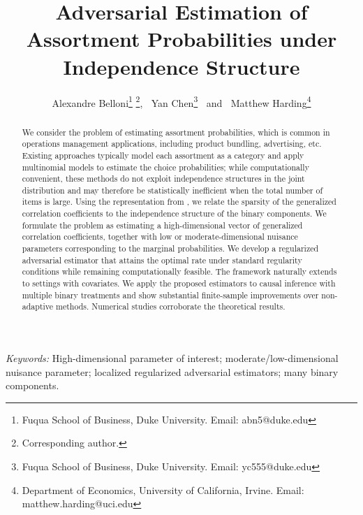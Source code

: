 \documentclass[11pt]{article}
\begin{document}
\title{{\textbf{\Large{}{}{}{}Adversarial Estimation of Assortment Probabilities under Independence Structure}}}
\author{Alexandre Belloni\thanks{Fuqua School of Business, Duke University. Email: abn5@duke.edu} \thanks{Corresponding author.}, $\ $ Yan Chen\thanks{Fuqua School of Business, Duke University. Email: yc555@duke.edu} $\ $ and $\ $ Matthew Harding\thanks{Department of Economics,
University of California, Irvine. Email: matthew.harding@uci.edu}}
\maketitle

\vspace{-1.0cm}
\onehalfspacing
\begin{abstract}
We consider the problem of estimating assortment probabilities, which is common in operations management applications, including product bundling, advertising, etc. Existing approaches typically model each assortment as a category and apply multinomial models to estimate the choice probabilities; while computationally convenient, these methods do not exploit independence structures in the joint distribution and may therefore be statistically inefficient when the total number of items is large. Using the representation from \citet{bahadur1959representation}, we relate the sparsity of the generalized correlation coefficients to the independence structure of the binary components. We formulate the problem as estimating a high-dimensional vector of generalized correlation coefficients, together with low or moderate-dimensional nuisance parameters corresponding to the marginal probabilities. We develop a regularized adversarial estimator that attains the optimal rate under standard regularity conditions while remaining computationally feasible. The framework naturally extends to settings with covariates. We apply the proposed estimators to causal inference with multiple binary treatments and show substantial finite-sample improvements over non-adaptive methods. Numerical studies corroborate the theoretical results. 
\end{abstract}
\noindent%
{\it Keywords:} High-dimensional parameter of interest; moderate/low-dimensional nuisance parameter; localized regularized adversarial estimators; many binary components. 
\vfill

\onehalfspacing
\end{document}
